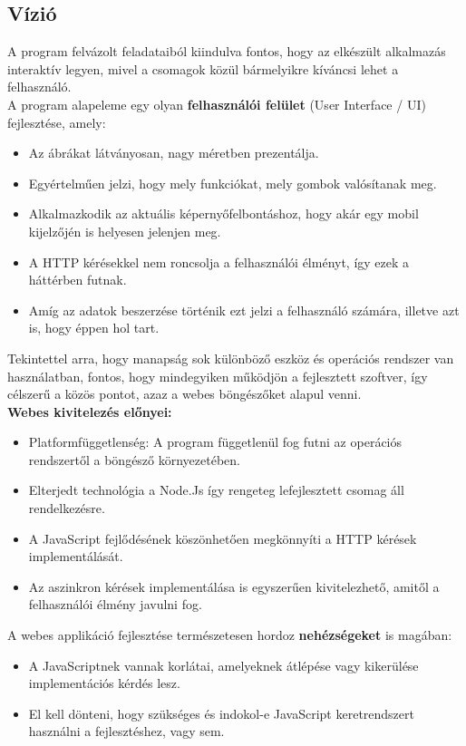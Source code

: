 \pagebreak

	\subsection{Vízió}
	
	A program felvázolt feladataiból kiindulva fontos, hogy az elkészült alkalmazás interaktív legyen, mivel a csomagok közül bármelyikre kíváncsi lehet a felhasználó.\\
	
	A program alapeleme egy olyan \textbf{felhasználói felület} (User Interface / UI) fejlesztése, amely: 
	
	\begin{itemize}
		\item Az ábrákat látványosan, nagy méretben prezentálja.
		\item Egyértelműen jelzi, hogy mely funkciókat, mely gombok valósítanak meg.
		\item Alkalmazkodik az aktuális képernyőfelbontáshoz, hogy akár egy mobil kijelzőjén is helyesen jelenjen meg.
		\item A HTTP kérésekkel nem roncsolja a felhasználói élményt, így ezek a háttérben futnak.
		\item Amíg az adatok beszerzése történik ezt jelzi a felhasználó számára, illetve azt is, hogy éppen hol tart.
	\end{itemize}
	
	Tekintettel arra, hogy manapság sok különböző eszköz és operációs rendszer van használatban, fontos, hogy mindegyiken működjön a fejlesztett szoftver, így célszerű a közös pontot, azaz a webes böngészőket alapul venni.\\
	 
	\textbf{Webes kivitelezés előnyei:}
	\begin{itemize}
		\item Platformfüggetlenség: A program függetlenül fog futni az operációs rendszertől a böngésző környezetében.
		\item Elterjedt technológia a Node.Js így rengeteg lefejlesztett csomag áll rendelkezésre.
		\item A JavaScript fejlődésének köszönhetően megkönnyíti a HTTP kérések implementálását.
		\item Az aszinkron kérések implementálása is egyszerűen kivitelezhető, amitől a felhasználói élmény javulni fog. 
	\end{itemize}
	
	\noindent A webes applikáció fejlesztése természetesen hordoz \textbf{nehézségeket} is magában:
	\begin{itemize}
		\item A JavaScriptnek vannak korlátai, amelyeknek átlépése vagy kikerülése implementációs kérdés lesz.
		\item El kell dönteni, hogy szükséges és indokol-e JavaScript keretrendszert használni a fejlesztéshez, vagy sem.
	\end{itemize}
	
